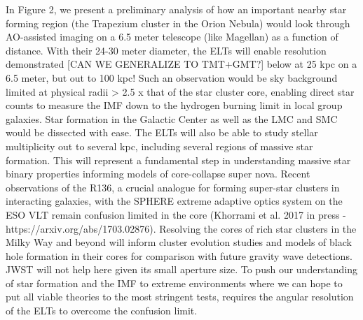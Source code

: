 \documentclass[11pt]{article}
\begin{document}
In Figure 2, we present a preliminary analysis of how an important nearby star forming region (the Trapezium cluster in the Orion Nebula) would look through AO-assisted imaging on a 6.5 meter telescope (like Magellan) as a function of distance.  
With their 24-30 meter diameter, the ELTs will enable resolution demonstrated [CAN WE GENERALIZE TO TMT+GMT?] below at 25 kpc on a 6.5 meter, but out to 100 kpc!  
Such an observation would be sky background limited at physical radii > 2.5 x that of the star cluster core, enabling direct star counts to measure the IMF down to the hydrogen burning limit in local group galaxies. 
Star formation in the Galactic Center as well as the 
LMC and SMC would be dissected with ease. 
The ELTs will also be able to study stellar multiplicity out to several kpc, including several regions of massive star formation.  
This will represent a fundamental step in understanding massive star binary properties informing models of core-collapse super nova. 
Recent observations of the R136, a crucial analogue for forming super-star clusters in interacting galaxies, with the SPHERE extreme adaptive optics system on the ESO VLT remain confusion limited in the core (Khorrami et al. 2017 in press - https://arxiv.org/abs/1703.02876). 
Resolving the cores of rich star clusters in the Milky Way and beyond will inform cluster evolution studies and models of black hole formation in their cores for comparison with future gravity wave detections.  
JWST will not help here given its small aperture size. 
To push our understanding of star formation and the IMF to extreme environments where we can hope to put all viable theories to the most stringent tests, requires the angular resolution of the ELTs to overcome the confusion limit. 
\end{document}
